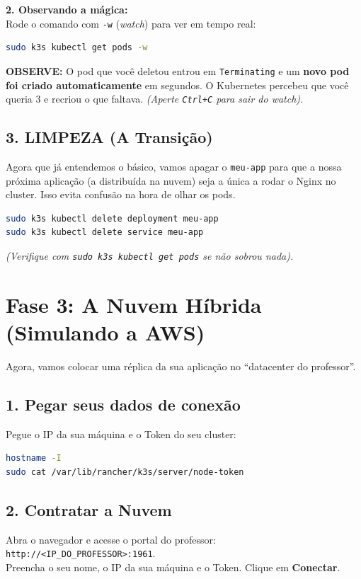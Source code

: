 \documentclass[11pt, a4paper]{article}
\begin{document}
\textbf{2. Observando a mágica:} \\
Rode o comando com \texttt{-w} (\textit{watch}) para ver em tempo real:

\begin{lstlisting}[language=bash]
sudo k3s kubectl get pods -w
\end{lstlisting}

\begin{tcolorbox}[colback=infobg, colframe=infoframe, arc=3pt, boxrule=0.8pt]
\textbf{OBSERVE:} O pod que você deletou entrou em \texttt{Terminating} e um \textbf{novo pod foi criado automaticamente} em segundos. O Kubernetes percebeu que você queria 3 e recriou o que faltava. \textit{(Aperte \texttt{Ctrl+C} para sair do watch).}
\end{tcolorbox}

\subsection*{3. LIMPEZA (A Transição)}
Agora que já entendemos o básico, vamos apagar o \texttt{meu-app} para que a nossa próxima aplicação (a distribuída na nuvem) seja a única a rodar o Nginx no cluster. Isso evita confusão na hora de olhar os pods.

\begin{lstlisting}[language=bash]
sudo k3s kubectl delete deployment meu-app
sudo k3s kubectl delete service meu-app
\end{lstlisting}
\textit{(Verifique com \texttt{sudo k3s kubectl get pods} se não sobrou nada).}

\section*{Fase 3: A Nuvem Híbrida (Simulando a AWS)}

Agora, vamos colocar uma réplica da sua aplicação no ``datacenter do professor''.

\subsection*{1. Pegar seus dados de conexão}
Pegue o IP da sua máquina e o Token do seu cluster:

\begin{lstlisting}[language=bash]
hostname -I
sudo cat /var/lib/rancher/k3s/server/node-token
\end{lstlisting}

\subsection*{2. Contratar a Nuvem}
Abra o navegador e acesse o portal do professor: \texttt{http://<IP\_DO\_PROFESSOR>:1961}. \\
Preencha o seu nome, o IP da sua máquina e o Token. Clique em \textbf{Conectar}.
\end{document}

